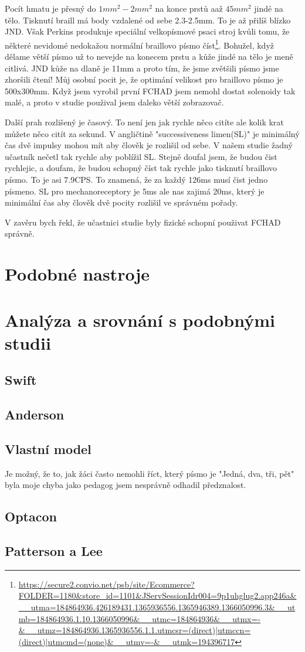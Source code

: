 Pocít hmatu je přesný do ${}1mm^2 - 2mm^2$ na konce prstů aaž ${}45mm^2$ jindé na tělo.  Tisknutí braill má body vzdalené od sebe 2.3-2.5mm\citep{brailleautority}. To je až přilíš blízko JND.  Však Perkins produkuje speciální velkopísmové psaci stroj kvůli tomu, že některé nevidomé nedokažou normální braillovo písmo číst\footnote{\url{https://secure2.convio.net/psb/site/Ecommerce?FOLDER=1180&store_id=1101&JServSessionIdr004=9p1uhglug2.app246a&__utma=184864936.426189431.1365936556.1365946389.1366050996.3&__utmb=184864936.1.10.1366050996&__utmc=184864936&__utmx=-&__utmz=184864936.1365936556.1.1.utmcsr=(direct)|utmccn=(direct)|utmcmd=(none)&__utmv=-&__utmk=194396717}}.  Bohužel, když dělame větší písmo už to nevejde na konecem prstu a kůže jindé na tělo je meně citlivá.  JND kůže na dlaně je 11mm a proto tím, že jsme zvětšili písmo jsme zhoršili čtení! Můj osobní pocit je, že optimání velikost pro braillovo písmo je 500x300mm.  Když jsem vyrobil první FCHAD jsem nemohl dostat solenoidy tak malé, a proto v studie použival jsem daleko větší zobrazovač\citep[str. 30-32]{nielsen2008gesture}.

Další prah rozlišený je časový.  To není jen jak rychle něco citíte ale kolik krat můžete něco citít za sekund.  V angličtině "successiveness limen(SL)" je minimálný čas dvě impulsy mohou mít aby člověk je rozlišil od sebe.  V našem studie žadný učastník nečetl tak rychle aby poblížil SL.  Stejně doufal jsem, že budou čist rychlejic, a doufam, že budou schopný číst tak rychle jako tisknutí braillovo písmo.  To je asi 7.9CPS\citep{wetzel2006studies}.  To znamená, že za každý 126ms musí čist jedno písmeno.  SL pro mechanoreceptory je 5ms ale nas zajimá 20ms, který je minimální čas aby člověk dvě pocity rozlišil ve správném pořady\citep[str. 32]{nielsen2008gesture}.

V zavěru bych řekl, že učastnici studie byly fizické schopní použivat FCHAD správně.

\section{Podobné nastroje}

\section{Analýza a srovnání s podobnými studii}

\subsection{Swift}
\subsection{Anderson}
\subsection{Vlastní model}
Je možný, že to, jak žáci často nemohli říct, který písmo je "Jedná, dva, tři, pět" byla moje chyba jako pedagog jsem nesprávně odhadil předznalost.
\subsection{Optacon}
\subsection{Patterson a Lee}
